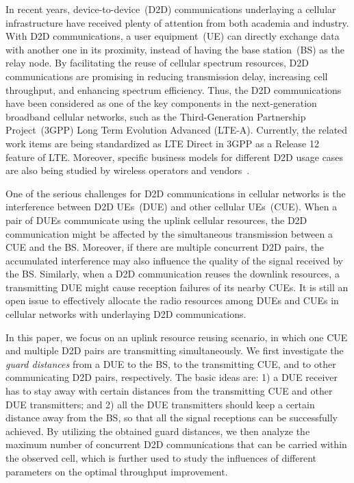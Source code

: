 \documentclass[journal, 10pt]{IEEEtran}
\begin{document}
In recent years, device-to-device~(D2D) communications underlaying a
cellular infrastructure have received plenty of attention from both
academia and industry. With D2D communications, a user equipment~(UE)
can directly exchange data with another one in its proximity, instead
of having the base station~(BS) as the relay node. By facilitating the
reuse of cellular spectrum resources, D2D communications are promising
in reducing transmission delay, increasing cell throughput, and
enhancing spectrum efficiency. Thus, the D2D communications have been
considered as one of the key components in the next-generation
broadband cellular networks, such as the Third-Generation Partnership
Project~(3GPP) Long Term Evolution Advanced (LTE-A). Currently, the
related work items are being standardized as LTE Direct in 3GPP as a
Release 12 feature of LTE. Moreover, specific business models for
different D2D usage cases are also being studied by wireless operators
and vendors~\cite{Lei:12MCom}.

One of the serious challenges for D2D communications in cellular
networks is the interference between D2D UEs~(DUE) and other cellular
UEs~(CUE). When a pair of DUEs communicate using the uplink cellular
resources, the D2D communication might be affected by the simultaneous
transmission between a CUE and the BS. Moreover, if there are multiple
concurrent D2D pairs, the accumulated interference may also influence
the quality of the signal received by the BS. Similarly, when a D2D
communication reuses the downlink resources, a transmitting DUE might
cause reception failures of its nearby CUEs. It is still an open issue
to effectively allocate the radio resources among DUEs and CUEs in
cellular networks with underlaying D2D communications.

In this paper, we focus on an uplink resource reusing scenario, in
which one CUE and multiple D2D pairs are transmitting simultaneously.
We first investigate the \emph{guard distances} from a DUE to the BS,
to the transmitting CUE, and to other communicating D2D pairs,
respectively. The basic ideas are: 1) a DUE receiver has to stay away
with certain distances from the transmitting CUE and other DUE
transmitters; and 2) all the DUE transmitters should keep a certain
distance away from the BS, so that all the signal receptions can be
successfully achieved. By utilizing the obtained guard distances, we
then analyze the maximum number of concurrent D2D communications that
can be carried within the observed cell, which is further used to study
the influences of different parameters on the optimal throughput
improvement. 
\end{document}
